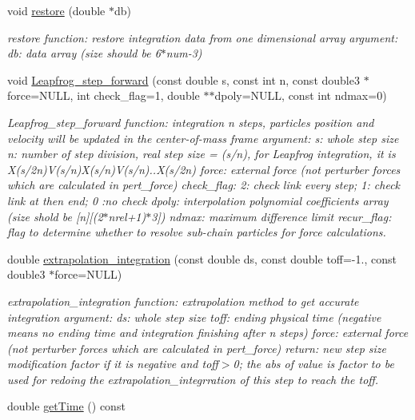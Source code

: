 \begin{DoxyCompactItemize}
void \hyperlink{classchain_a6450983197baedc6f5c8f0cb59702340}{restore} (double $\ast$db)
\begin{DoxyCompactList}\small\item\em restore function\+: restore integration data from one dimensional array argument\+: db\+: data array (size should be 6$\ast$num-\/3) \end{DoxyCompactList}\item 
void \hyperlink{classchain_a337be88f209915ffceb971b27f71f0be}{Leapfrog\+\_\+step\+\_\+forward} (const double s, const int n, const double3 $\ast$force=N\+U\+LL, int check\+\_\+flag=1, double $\ast$$\ast$dpoly=N\+U\+LL, const int ndmax=0)
\begin{DoxyCompactList}\small\item\em Leapfrog\+\_\+step\+\_\+forward function\+: integration n steps, particles\textquotesingle{} position and velocity will be updated in the center-\/of-\/mass frame argument\+: s\+: whole step size n\+: number of step division, real step size = (s/n), for Leapfrog integration, it is X(s/2n)V(s/n)X(s/n)V(s/n)..X(s/2n) force\+: external force (not perturber forces which are calculated in pert\+\_\+force) check\+\_\+flag\+: 2\+: check link every step; 1\+: check link at then end; 0 \+:no check dpoly\+: interpolation polynomial coefficients array (size shold be \mbox{[}n\mbox{]}\mbox{[}(2$\ast$nrel+1)$\ast$3\mbox{]}) ndmax\+: maximum difference limit recur\+\_\+flag\+: flag to determine whether to resolve sub-\/chain particles for force calculations. \end{DoxyCompactList}\item 
double \hyperlink{classchain_ae6fe95b3bebd4ce9e0cc39086cec88f1}{extrapolation\+\_\+integration} (const double ds, const double toff=-\/1., const double3 $\ast$force=N\+U\+LL)
\begin{DoxyCompactList}\small\item\em extrapolation\+\_\+integration function\+: extrapolation method to get accurate integration argument\+: ds\+: whole step size toff\+: ending physical time (negative means no ending time and integration finishing after n steps) force\+: external force (not perturber forces which are calculated in pert\+\_\+force) return\+: new step size modification factor if it is negative and toff$>$0; the abs of value is factor to be used for redoing the extrapolation\+\_\+integrration of this step to reach the toff. \end{DoxyCompactList}\item 
double \hyperlink{classchain_ae17d47b7c94181f9aa15b59c772a4fae}{get\+Time} () const
$$
\end{DoxyCompactItemize}
